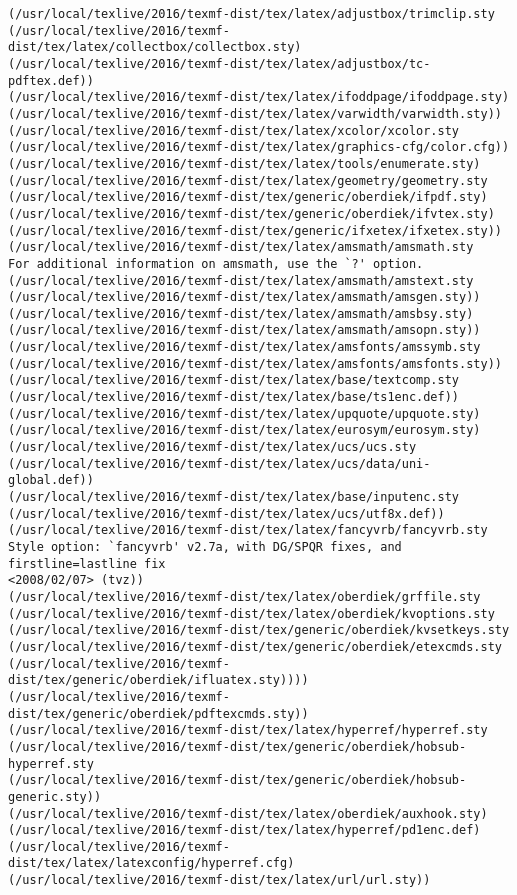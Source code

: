 \documentclass[11pt]{article}
\begin{document}
\begin{Verbatim}[commandchars=\\\{\}]
(/usr/local/texlive/2016/texmf-dist/tex/latex/adjustbox/trimclip.sty
(/usr/local/texlive/2016/texmf-dist/tex/latex/collectbox/collectbox.sty)
(/usr/local/texlive/2016/texmf-dist/tex/latex/adjustbox/tc-pdftex.def))
(/usr/local/texlive/2016/texmf-dist/tex/latex/ifoddpage/ifoddpage.sty)
(/usr/local/texlive/2016/texmf-dist/tex/latex/varwidth/varwidth.sty))
(/usr/local/texlive/2016/texmf-dist/tex/latex/xcolor/xcolor.sty
(/usr/local/texlive/2016/texmf-dist/tex/latex/graphics-cfg/color.cfg))
(/usr/local/texlive/2016/texmf-dist/tex/latex/tools/enumerate.sty)
(/usr/local/texlive/2016/texmf-dist/tex/latex/geometry/geometry.sty
(/usr/local/texlive/2016/texmf-dist/tex/generic/oberdiek/ifpdf.sty)
(/usr/local/texlive/2016/texmf-dist/tex/generic/oberdiek/ifvtex.sty)
(/usr/local/texlive/2016/texmf-dist/tex/generic/ifxetex/ifxetex.sty))
(/usr/local/texlive/2016/texmf-dist/tex/latex/amsmath/amsmath.sty
For additional information on amsmath, use the `?' option.
(/usr/local/texlive/2016/texmf-dist/tex/latex/amsmath/amstext.sty
(/usr/local/texlive/2016/texmf-dist/tex/latex/amsmath/amsgen.sty))
(/usr/local/texlive/2016/texmf-dist/tex/latex/amsmath/amsbsy.sty)
(/usr/local/texlive/2016/texmf-dist/tex/latex/amsmath/amsopn.sty))
(/usr/local/texlive/2016/texmf-dist/tex/latex/amsfonts/amssymb.sty
(/usr/local/texlive/2016/texmf-dist/tex/latex/amsfonts/amsfonts.sty))
(/usr/local/texlive/2016/texmf-dist/tex/latex/base/textcomp.sty
(/usr/local/texlive/2016/texmf-dist/tex/latex/base/ts1enc.def))
(/usr/local/texlive/2016/texmf-dist/tex/latex/upquote/upquote.sty)
(/usr/local/texlive/2016/texmf-dist/tex/latex/eurosym/eurosym.sty)
(/usr/local/texlive/2016/texmf-dist/tex/latex/ucs/ucs.sty
(/usr/local/texlive/2016/texmf-dist/tex/latex/ucs/data/uni-global.def))
(/usr/local/texlive/2016/texmf-dist/tex/latex/base/inputenc.sty
(/usr/local/texlive/2016/texmf-dist/tex/latex/ucs/utf8x.def))
(/usr/local/texlive/2016/texmf-dist/tex/latex/fancyvrb/fancyvrb.sty
Style option: `fancyvrb' v2.7a, with DG/SPQR fixes, and firstline=lastline fix 
<2008/02/07> (tvz))
(/usr/local/texlive/2016/texmf-dist/tex/latex/oberdiek/grffile.sty
(/usr/local/texlive/2016/texmf-dist/tex/latex/oberdiek/kvoptions.sty
(/usr/local/texlive/2016/texmf-dist/tex/generic/oberdiek/kvsetkeys.sty
(/usr/local/texlive/2016/texmf-dist/tex/generic/oberdiek/etexcmds.sty
(/usr/local/texlive/2016/texmf-dist/tex/generic/oberdiek/ifluatex.sty))))
(/usr/local/texlive/2016/texmf-dist/tex/generic/oberdiek/pdftexcmds.sty))
(/usr/local/texlive/2016/texmf-dist/tex/latex/hyperref/hyperref.sty
(/usr/local/texlive/2016/texmf-dist/tex/generic/oberdiek/hobsub-hyperref.sty
(/usr/local/texlive/2016/texmf-dist/tex/generic/oberdiek/hobsub-generic.sty))
(/usr/local/texlive/2016/texmf-dist/tex/latex/oberdiek/auxhook.sty)
(/usr/local/texlive/2016/texmf-dist/tex/latex/hyperref/pd1enc.def)
(/usr/local/texlive/2016/texmf-dist/tex/latex/latexconfig/hyperref.cfg)
(/usr/local/texlive/2016/texmf-dist/tex/latex/url/url.sty))


\end{Verbatim}
\end{document}
